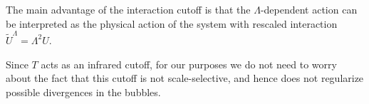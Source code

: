 The main advantage of the interaction cutoff is that  the $\Lambda$-dependent action can be interpreted\cite{Honerkamp2004} as the physical action of the system with rescaled interaction $\tilde{U}^\Lambda = \Lambda^2 U$.

Since $T$ acts as an infrared cutoff, for our purposes we do not need to worry about the fact that this cutoff is not scale-selective, and hence does not regularize possible divergences in the bubbles. 



   
